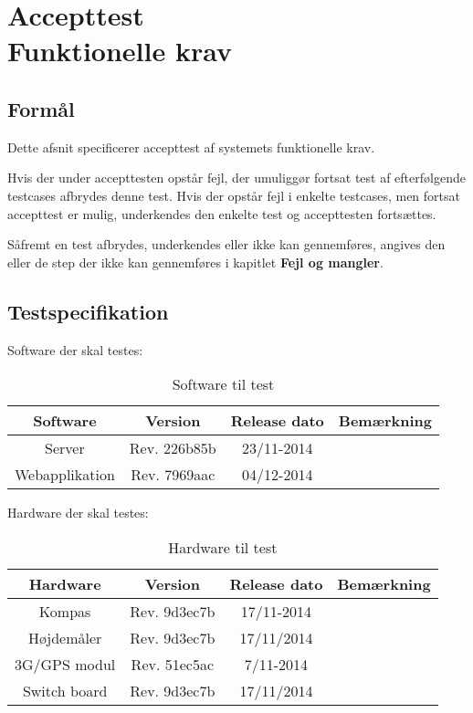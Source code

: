 \chapter{Accepttest \\ Funktionelle krav}

\vspace{-1cm}

\section*{Formål}
\vspace{-0.5cm}

Dette afsnit specificerer accepttest af systemets funktionelle krav. 

Hvis der under accepttesten opstår fejl, der umuliggør fortsat test af efterfølgende testcases afbrydes denne test. Hvis der opstår fejl i enkelte testcases, men fortsat accepttest er mulig, underkendes den enkelte test og accepttesten fortsættes.

Såfremt en test afbrydes, underkendes eller ikke kan gennemføres, angives den eller de step der ikke kan gennemføres i kapitlet \textbf{Fejl og mangler}. 


\section*{Testspecifikation}
\vspace{-0.5cm}
Software der skal testes:
\begin{table}[H]
	\centering
		\begin{tabular}{|c|c|c|c|}
			\hline
			Software & Version & Release dato & Bemærkning \\ \hline
			Server & Rev. 226b85b & 23/11-2014 & \\ \hline			
			Webapplikation & Rev. 7969aac & 04/12-2014 &\\ \hline
		\end{tabular}
	\caption{Software til test}
\end{table}

Hardware der skal testes:
\begin{table}[H]
	\centering
		\begin{tabular}{|c|c|c|c|}
			\hline
			Hardware & Version & Release dato & Bemærkning \\ \hline
			Kompas 			& Rev. 9d3ec7b & 17/11-2014 &  \\ \hline			
			Højdemåler 		& Rev. 9d3ec7b & 17/11/2014 &  \\ \hline
			3G/GPS modul 	& Rev. 51ec5ac & 7/11-2014 &  \\ \hline
			Switch board 	& Rev. 9d3ec7b & 17/11/2014 &  \\ \hline
		\end{tabular}
	\caption{Hardware til test}
\end{table}


